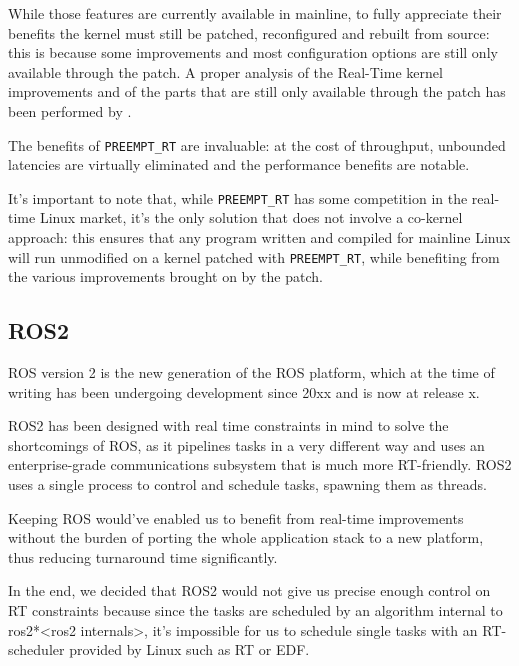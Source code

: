 \documentclass[a4paper,12pt]{report}
\begin{document}
While those features are currently available in mainline, to fully appreciate their benefits the kernel must still be patched, reconfigured and rebuilt from source: this is because some improvements and most configuration options are still only available through the patch. A proper analysis of the Real-Time kernel improvements and of the parts that are still only available through the patch has been performed by \textcite{survey-preempt-rt}.

The benefits of \texttt{PREEMPT\_RT}  are invaluable: at the cost of throughput, unbounded latencies are virtually eliminated and the performance benefits are notable\cite{dmoceri-benchmarking-rtlinux}.

It's important to note that, while \texttt{PREEMPT\_RT} has some competition in the real-time Linux market, it's the only solution that does not involve a co-kernel approach: this ensures that any program written and compiled for mainline Linux will run unmodified on a kernel patched with \texttt{PREEMPT\_RT}, while benefiting from the various improvements brought on by the patch. 

\subsection{ROS2}

ROS version 2 is the new generation of the ROS platform, which at the time of writing has been undergoing development since 20xx and is now at release x.

ROS2 has been designed with real time constraints in mind to solve the shortcomings of ROS\cite{ros2-realtime-intro}, as it pipelines tasks in a very different way and uses an enterprise-grade communications subsystem that is much more RT-friendly. ROS2 uses a single process to control and schedule tasks, spawning them as threads.

Keeping ROS would've enabled us to benefit from real-time improvements without the burden of porting the whole application stack to a new platform, thus reducing turnaround time significantly. 

In the end, we decided that ROS2 would not give us precise enough control on RT constraints because since the tasks are scheduled by an algorithm internal to ros2*<ros2 internals>, it's impossible for us to schedule single tasks with an RT-scheduler provided by Linux such as RT or EDF. 
\end{document}
